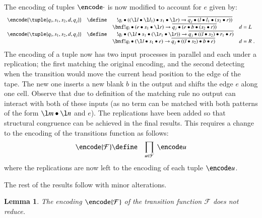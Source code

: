 \documentclass[submission,copyright,creativecommons]{eptcs}
\newtheorem{lemma}[theorem]{Lemma}
\renewcommand{\iap}[1]{#1\to}
\newcommand{\oan}[1]{\overline{#1}}
\begin{document}
The encoding of tuples $\encode\cdot$ is now modified to account for $e$ given by:
\begin{equation*}
\begin{array}{rcll}
\encode{\tuple {q_i,s_1,s_2,d,q_j}}
&\define&\ \ \ 
!\iap {q_i\bullet ((\enclist{\l l_1\bullet \l l}{\l l\bullet \l l_1})\bullet s_1\bullet \l r)}
\oan {q_j\bullet (l\bullet l_1\bullet (s_2\bullet r))}\\ \ &\ &\bnf
!\iap {q_i\bullet (e\bullet s_1\bullet \l r)}
\oan {q_j\bullet (e\bullet b\bullet (s_2\bullet r))}\qquad&d=L\\
\encode{\tuple {q_i,s_1,s_2,d,q_j}}
&\define&\ \ \ 
!\iap {q_i\bullet (\l l\bullet s_1\bullet (\l r_1\bullet \l r))}
\oan {q_j\bullet ((\enclist{s_2\bullet l}{l\bullet s_2})\bullet r_1\bullet r)}\\ \ &\ &\bnf
!\iap {q_i\bullet (\l l\bullet s_1\bullet e)}
\oan {q_j\bullet ((\enclist{s_2\bullet l}{l\bullet s_2})\bullet b\bullet e)}\qquad&d=R\; .
\end{array}
\end{equation*}
The encoding of a tuple now has two input processes in parallel and each under
a replication;
the first matching the original encoding, and the second detecting when the
transition would move the current head position to the edge of the tape.
The new one inserts a new blank $b$ in the output and shifts the edge $e$ along
one cell.
Observe that due to definition of the matching rule no output can interact
with both of these inputs (as no term can be matched with both patterns of the
form $\l m\bullet \l n$ and $e$).
The replications have been added so that structural congruence can be achieved in
the final results. This requires a change to the encoding of the transitions
function as follows:
\begin{eqnarray*}
\encode{\mathcal F} &\define& 
\prod _{u\in{\mathcal F}} \ \encode u
\end{eqnarray*}
where the replications are now left to the encoding of each tuple $\encode u$.

The rest of the results follow with minor alterations.

\begin{lemma}
\label{lem:fin:trans-no-red}
The encoding $\encode{{\mathcal F}}$ of the transition function ${\mathcal F}$
does not reduce.
\end{lemma}
\end{document}
